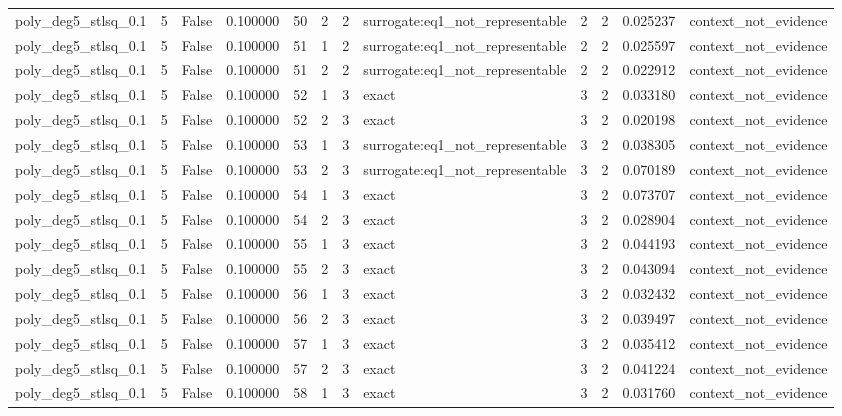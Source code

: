 \begin{tabular}{lrrrrrrlrrrl}
poly\_deg5\_stlsq\_0.1 & 5 & False & 0.100000 & 50 & 2 & 2 & surrogate:eq1\_not\_representable & 2 & 2 & 0.025237 & context\_not\_evidence \\
poly\_deg5\_stlsq\_0.1 & 5 & False & 0.100000 & 51 & 1 & 2 & surrogate:eq1\_not\_representable & 2 & 2 & 0.025597 & context\_not\_evidence \\
poly\_deg5\_stlsq\_0.1 & 5 & False & 0.100000 & 51 & 2 & 2 & surrogate:eq1\_not\_representable & 2 & 2 & 0.022912 & context\_not\_evidence \\
poly\_deg5\_stlsq\_0.1 & 5 & False & 0.100000 & 52 & 1 & 3 & exact & 3 & 2 & 0.033180 & context\_not\_evidence \\
poly\_deg5\_stlsq\_0.1 & 5 & False & 0.100000 & 52 & 2 & 3 & exact & 3 & 2 & 0.020198 & context\_not\_evidence \\
poly\_deg5\_stlsq\_0.1 & 5 & False & 0.100000 & 53 & 1 & 3 & surrogate:eq1\_not\_representable & 3 & 2 & 0.038305 & context\_not\_evidence \\
poly\_deg5\_stlsq\_0.1 & 5 & False & 0.100000 & 53 & 2 & 3 & surrogate:eq1\_not\_representable & 3 & 2 & 0.070189 & context\_not\_evidence \\
poly\_deg5\_stlsq\_0.1 & 5 & False & 0.100000 & 54 & 1 & 3 & exact & 3 & 2 & 0.073707 & context\_not\_evidence \\
poly\_deg5\_stlsq\_0.1 & 5 & False & 0.100000 & 54 & 2 & 3 & exact & 3 & 2 & 0.028904 & context\_not\_evidence \\
poly\_deg5\_stlsq\_0.1 & 5 & False & 0.100000 & 55 & 1 & 3 & exact & 3 & 2 & 0.044193 & context\_not\_evidence \\
poly\_deg5\_stlsq\_0.1 & 5 & False & 0.100000 & 55 & 2 & 3 & exact & 3 & 2 & 0.043094 & context\_not\_evidence \\
poly\_deg5\_stlsq\_0.1 & 5 & False & 0.100000 & 56 & 1 & 3 & exact & 3 & 2 & 0.032432 & context\_not\_evidence \\
poly\_deg5\_stlsq\_0.1 & 5 & False & 0.100000 & 56 & 2 & 3 & exact & 3 & 2 & 0.039497 & context\_not\_evidence \\
poly\_deg5\_stlsq\_0.1 & 5 & False & 0.100000 & 57 & 1 & 3 & exact & 3 & 2 & 0.035412 & context\_not\_evidence \\
poly\_deg5\_stlsq\_0.1 & 5 & False & 0.100000 & 57 & 2 & 3 & exact & 3 & 2 & 0.041224 & context\_not\_evidence \\
poly\_deg5\_stlsq\_0.1 & 5 & False & 0.100000 & 58 & 1 & 3 & exact & 3 & 2 & 0.031760 & context\_not\_evidence \\

\end{tabular}
